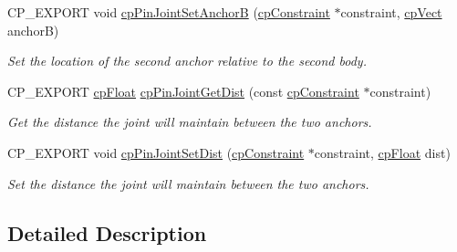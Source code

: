 \begin{DoxyCompactItemize}
\mbox{\label{group__cp_pin_joint_ga70254f1f1e082f55544ae29593a37b6b}} 
C\+P\+\_\+\+E\+X\+P\+O\+RT void \mbox{\hyperlink{group__cp_pin_joint_ga70254f1f1e082f55544ae29593a37b6b}{cp\+Pin\+Joint\+Set\+AnchorB}} (\mbox{\hyperlink{structcp_constraint}{cp\+Constraint}} $\ast$constraint, \mbox{\hyperlink{structcp_vect}{cp\+Vect}} anchorB)
\begin{DoxyCompactList}\small\item\em Set the location of the second anchor relative to the second body. \end{DoxyCompactList}\item 
\mbox{\label{group__cp_pin_joint_ga65f2f893e5949242075cf2e0c17874dd}} 
C\+P\+\_\+\+E\+X\+P\+O\+RT \mbox{\hyperlink{group__basic_types_gac1ed65573e035bf892505768c852d8d3}{cp\+Float}} \mbox{\hyperlink{group__cp_pin_joint_ga65f2f893e5949242075cf2e0c17874dd}{cp\+Pin\+Joint\+Get\+Dist}} (const \mbox{\hyperlink{structcp_constraint}{cp\+Constraint}} $\ast$constraint)
\begin{DoxyCompactList}\small\item\em Get the distance the joint will maintain between the two anchors. \end{DoxyCompactList}\item 
\mbox{\label{group__cp_pin_joint_gaa83a79c929128035c6d47125d60f797b}} 
C\+P\+\_\+\+E\+X\+P\+O\+RT void \mbox{\hyperlink{group__cp_pin_joint_gaa83a79c929128035c6d47125d60f797b}{cp\+Pin\+Joint\+Set\+Dist}} (\mbox{\hyperlink{structcp_constraint}{cp\+Constraint}} $\ast$constraint, \mbox{\hyperlink{group__basic_types_gac1ed65573e035bf892505768c852d8d3}{cp\+Float}} dist)
\begin{DoxyCompactList}\small\item\em Set the distance the joint will maintain between the two anchors. \end{DoxyCompactList}\end{DoxyCompactItemize}


\subsection{Detailed Description}
